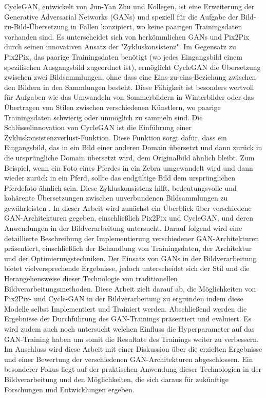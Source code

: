 \newline
CycleGAN, entwickelt von Jun-Yan Zhu und Kollegen, ist eine Erweiterung der Generative Adversarial Networks (GANs) und speziell für die Aufgabe der Bild-zu-Bild-Übersetzung in Fällen konzipiert, wo keine paarigen Trainingsdaten vorhanden sind. Es unterscheidet sich von herkömmlichen GANs und Pix2Pix durch seinen innovativen Ansatz der "Zykluskonsistenz".
Im Gegensatz zu Pix2Pix, das paarige Trainingsdaten benötigt (wo jedes Eingangsbild einem spezifischen Ausgangsbild zugeordnet ist), ermöglicht CycleGAN die Übersetzung zwischen zwei Bildsammlungen, ohne dass eine Eins-zu-eins-Beziehung zwischen den Bildern in den Sammlungen besteht. Diese Fähigkeit ist besonders wertvoll für Aufgaben wie das Umwandeln von Sommerbildern in Winterbilder oder das Übertragen von Stilen zwischen verschiedenen Künstlern, wo paarige Trainingsdaten schwierig oder unmöglich zu sammeln sind.
Die Schlüsselinnovation von CycleGAN ist die Einführung einer Zykluskonsistenzverlust-Funktion. Diese Funktion sorgt dafür, dass ein Eingangsbild, das in ein Bild einer anderen Domain übersetzt und dann zurück in die ursprüngliche Domain übersetzt wird, dem Originalbild ähnlich bleibt. Zum Beispiel, wenn ein Foto eines Pferdes in ein Zebra umgewandelt wird und dann wieder zurück in ein Pferd, sollte das endgültige Bild dem ursprünglichen Pferdefoto ähnlich sein. Diese Zykluskonsistenz hilft, bedeutungsvolle und kohärente Übersetzungen zwischen unverbundenen Bildsammlungen zu gewährleisten \cite{Zhu.2017}.\newline
In dieser Arbeit wird zunächst ein Überblick über verschiedene GAN-Architekturen gegeben, einschließlich Pix2Pix und CycleGAN, und deren Anwendungen in der Bildverarbeitung untersucht. Darauf folgend wird eine detaillierte Beschreibung der Implementierung verschiedener GAN-Architekturen präsentiert, einschließlich der Behandlung von Trainingsdaten, der Architektur und der Optimierungstechniken. \newline
Der Einsatz von GANs in der Bildverarbeitung bietet vielversprechende Ergebnisse, jedoch unterscheidet sich der Stil und die Herangehensweise dieser Technologie von traditionellen Bildverarbeitungsmethoden. Diese Arbeit zielt darauf ab, die Möglichkeiten von Pix2Pix- und Cycle-GAN in der Bildverarbeitung zu ergründen indem diese Modelle selbst Implementiert und Trainiert werden. \newline
Abschließend werden die Ergebnisse der Durchführung des GAN-Trainings präsentiert und evaluiert. Es wird zudem auch noch untersucht welchen Einfluss die Hyperparameter auf das GAN-Training haben um somit die Resultate des Trainings weiter zu verbessern. \newline 
Im Anschluss wird diese Arbeit mit einer Diskussion über die erzielten Ergebnisse und einer Bewertung der verschiedenen GAN-Architekturen abgeschlossen. Ein besonderer Fokus liegt auf der praktischen Anwendung dieser Technologien in der Bildverarbeitung und den Möglichkeiten, die sich daraus für zukünftige Forschungen und Entwicklungen ergeben. \newline 
